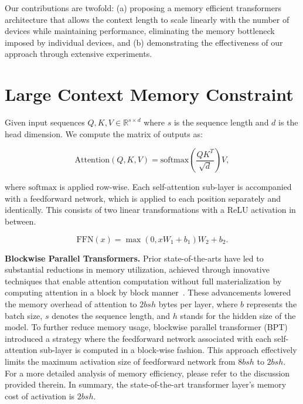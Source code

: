 Our contributions are twofold: (a) proposing a memory efficient transformers architecture that allows the context length to scale linearly with the number of devices while maintaining performance, eliminating the memory bottleneck imposed by individual devices, and (b) demonstrating the effectiveness of our approach through extensive experiments.

\section{Large Context Memory Constraint} Given input sequences $Q, K, V \in \mathbb{R}^{s \times d}$ where $s$ is the sequence length and $d$ is the head dimension. We compute the matrix of outputs as:

\begin{equation*}
   \mathrm{Attention}(Q, K, V) = \mathrm{softmax}(\frac{QK^T}{\sqrt{d}})V,
\end{equation*}

where $\mathrm{softmax}$ is applied row-wise. Each self-attention sub-layer is accompanied with a feedforward network, which is applied to each position separately and identically. This consists of two linear transformations with a ReLU activation in between.

\begin{equation*}
   \mathrm{FFN}(x)=\max(0, xW_1 + b_1) W_2 + b_2.
\end{equation*}

\textbf{Blockwise Parallel Transformers.} Prior state-of-the-arts have led to substantial reductions in memory utilization, achieved through innovative techniques that enable attention computation without full materialization by computing attention in a block by block manner~\citep{rabe2021self, dao2022flashattention, liu2023blockwise}. These advancements lowered the memory overhead of attention to $2bsh$ bytes per layer, where $b$ represents the batch size, $s$ denotes the sequence length, and $h$ stands for the hidden size of the model. To further reduce memory usage, blockwise parallel transformer (BPT)~\citep{liu2023blockwise} introduced a strategy where the feedforward network associated with each self-attention sub-layer is computed in a block-wise fashion. This approach effectively limits the maximum activation size of feedforward network from $8bsh$ to $2bsh$. For a more detailed analysis of memory efficiency, please refer to the discussion provided therein. In summary, the state-of-the-art transformer layer's memory cost of activation is $2bsh$.

